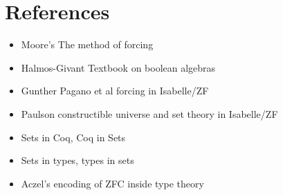 \documentclass[a4paper,USenglish,cleveref, autoref]{lipics-v2019}
\begin{document}
\section{References}
\begin{itemize}
\item Moore's The method of forcing
\item Halmos-Givant Textbook on boolean algebras
\item Gunther Pagano et al forcing in Isabelle/ZF
\item Paulson constructible universe and set theory in Isabelle/ZF
\item Sets in Coq, Coq in Sets
\item Sets in types, types in sets
\item Aczel's encoding of ZFC inside type theory
\end{itemize}
\end{document}
